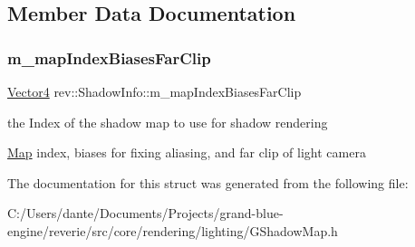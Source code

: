 \subsection{Member Data Documentation}
\mbox{\label{structrev_1_1_shadow_info_aecab5e4cf1c5c85fa6c4a4ce619348a8}} 
\subsubsection{\texorpdfstring{m\_mapIndexBiasesFarClip}{m\_mapIndexBiasesFarClip}}
{\footnotesize\ttfamily \mbox{\hyperlink{classrev_1_1_vector}{Vector4}} rev\+::\+Shadow\+Info\+::m\+\_\+map\+Index\+Biases\+Far\+Clip}



the Index of the shadow map to use for shadow rendering 

\mbox{\hyperlink{classrev_1_1_map}{Map}} index, biases for fixing aliasing, and far clip of light camera 

The documentation for this struct was generated from the following file\+:\begin{DoxyCompactItemize}
\item 
C\+:/\+Users/dante/\+Documents/\+Projects/grand-\/blue-\/engine/reverie/src/core/rendering/lighting/G\+Shadow\+Map.\+h\end{DoxyCompactItemize}
